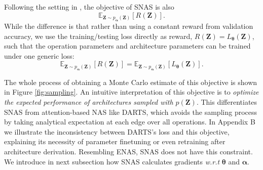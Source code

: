 \documentclass{article} \usepackage{iclr2019_conference,times}
\begin{document}
Following the setting in \citet{zoph2016neural}, the objective of SNAS is also
\begin{equation}
\mathbb{E}_{\bm{Z}\sim p_{\bm{\alpha}}(\bm{Z})}[R(\bm{Z})]. 
\end{equation}
While the difference is that rather than using a constant reward from validation accuracy, we use the training/testing loss directly as reward, $R(\bm{Z}) = L_{\bm{\theta}}(\bm{Z})$, such that the operation parameters and architecture parameters can be trained under one generic loss: 
\begin{equation}
\mathbb{E}_{\bm{Z}\sim p_{\bm{\alpha}}(\bm{Z})}[R(\bm{Z})] = \mathbb{E}_{\bm{Z}\sim p_{\bm{\alpha}}(\bm{Z})}[L_{\bm{\theta}}(\bm{Z})].
\label{eq:objective}
\end{equation}

The whole process of obtaining a Monte Carlo estimate of this objective is shown in Figure \ref{fig:sampling}. An intuitive interpretation of this objective is to \textit{optimize the expected performance of architectures sampled with $p(\bm{Z})$}. This differentiates SNAS from attention-based NAS like DARTS, which avoids the sampling process by taking analytical expectation at each edge over all operations. In Appendix B we illustrate the inconsistency between DARTS's loss and this objective, explaining its necessity of parameter finetuning or even retraining after architecture derivation. Resembling ENAS, SNAS does not have this constraint. We introduce in next subsection how SNAS calculates gradients \textit{w.r.t} $\bm{\theta}$ and $\bm{\alpha}$. 
\end{document}

